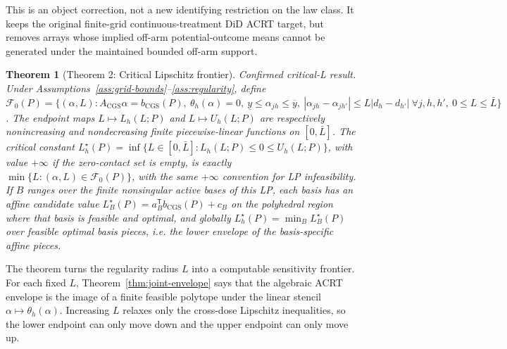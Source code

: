 \documentclass[11pt]{article}
\newcommand{\transpose}{\mathsf{T}}
\theoremstyle{definition}
\theoremstyle{plain}
\newtheorem{theorem}{Theorem}
\theoremstyle{remark}
\begin{document}
This is an object correction, not a new identifying restriction on the law class.  It keeps the original finite-grid continuous-treatment DiD ACRT target, but removes arrays whose implied off-arm potential-outcome means cannot be generated under the maintained bounded off-arm support.

\begin{theorem}[Theorem 2: Critical Lipschitz frontier]\label{thm:critical-l}\label{conj:critical-l}
Confirmed critical-L result. Under Assumptions~\ref{ass:grid-bounds}--\ref{ass:regularity}, define \(\mathcal F_0(P)=\{(\alpha,L):A_{\mathrm{CGS}}\alpha=b_{\mathrm{CGS}}(P),\ \theta_h(\alpha)=0,\ \underline y\le\alpha_{jh}\le\overline y,\ |\alpha_{j h}-\alpha_{j h'}|\le L|d_h-d_{h'}|\ \forall j,h,h',\ 0\le L\le\bar L\}\). The endpoint maps \(L\mapsto L_h(L;P)\) and \(L\mapsto U_h(L;P)\) are respectively nonincreasing and nondecreasing finite piecewise-linear functions on \([0,\bar L]\). The critical constant \(L_h^\star(P)=\inf\{L\in[0,\bar L]:L_h(L;P)\le0\le U_h(L;P)\}\), with value \(+\infty\) if the zero-contact set is empty, is exactly \(\min\{L:(\alpha,L)\in\mathcal F_0(P)\}\), with the same \(+\infty\) convention for LP infeasibility. If \(B\) ranges over the finite nonsingular active bases of this LP, each basis has an affine candidate value \(L_B^\star(P)=a_B^\transpose b_{\mathrm{CGS}}(P)+c_B\) on the polyhedral region where that basis is feasible and optimal, and globally \(L_h^\star(P)=\min_B L_B^\star(P)\) over feasible optimal basis pieces, i.e. the lower envelope of the basis-specific affine pieces.
\end{theorem}

The theorem turns the regularity radius \(L\) into a computable sensitivity frontier.  For each fixed \(L\), Theorem~\ref{thm:joint-envelope} says that the algebraic ACRT envelope is the image of a finite feasible polytope under the linear stencil \(\alpha\mapsto\theta_h(\alpha)\).  Increasing \(L\) relaxes only the cross-dose Lipschitz inequalities, so the lower endpoint can only move down and the upper endpoint can only move up.
\end{document}
